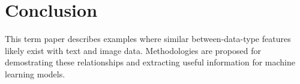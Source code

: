 \chapter{Conclusion}

This term paper describes examples where similar between-data-type features likely exist with text and image data.  Methodologies are proposed for demostrating these relationships and extracting useful information for machine learning models.  
